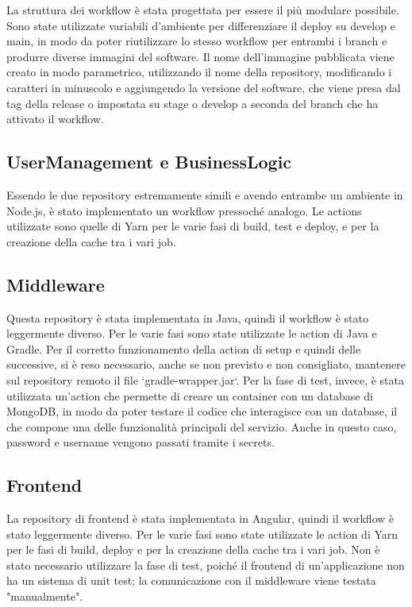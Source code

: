 La struttura dei workflow è stata progettata per essere il più modulare possibile. Sono state utilizzate variabili d'ambiente per differenziare il deploy su develop e main, in modo da poter riutilizzare lo stesso workflow per entrambi i branch e produrre diverse immagini del software. Il nome dell'immagine pubblicata viene creato in modo parametrico, utilizzando il nome della repository, modificando i caratteri in minuscolo e aggiungendo la versione del software, che viene presa dal tag della release o impostata su stage o develop a seconda del branch che ha attivato il workflow.

\subsection{UserManagement e BusinessLogic} 
Essendo le due repository estremamente simili e avendo entrambe un ambiente in Node.js, è stato implementato un workflow pressoché analogo. Le actions utilizzate sono quelle di Yarn per le varie fasi di build, test e deploy, e per la creazione della cache tra i vari job.

\subsection{Middleware} 
Questa repository è stata implementata in Java, quindi il workflow è stato leggermente diverso. Per le varie fasi sono state utilizzate le action di Java e Gradle. Per il corretto funzionamento della action di setup e quindi delle successive, si è reso necessario, anche se non previsto e non consigliato, mantenere sul repository remoto il file `gradle-wrapper.jar`. Per la fase di test, invece, è stata utilizzata un'action che permette di creare un container con un database di MongoDB, in modo da poter testare il codice che interagisce con un database, il che compone una delle funzionalità principali del servizio. Anche in questo caso, password e username vengono passati tramite i secrets.

\subsection{Frontend}
La repository di frontend è stata implementata in Angular, quindi il workflow è stato leggermente diverso. Per le varie fasi sono state utilizzate le action di Yarn per le fasi di build, deploy e per la creazione della cache tra i vari job. Non è stato necessario utilizzare la fase di test, poiché il frontend di un'applicazione non ha un sistema di unit test; la comunicazione con il middleware viene testata "manualmente".




